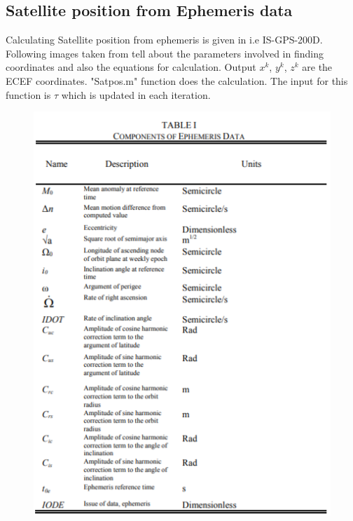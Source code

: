 \documentclass[conference,compsoc]{IEEEtran}
\begin{document}
\subsection{Satellite position from Ephemeris data}
Calculating Satellite position from ephemeris is given in \cite{doc1} i.e IS-GPS-200D. Following images taken from \cite{doc1} tell about the parameters involved in finding coordinates and also the equations for calculation. Output $x^k$, $y^k$, $z^k$ are the ECEF coordinates. "Satpos.m" function does the calculation. The input for this function is $\tau$ which is updated in each iteration.
\begin{figure}[!h]
	\centering
	\includegraphics[scale = 0.5]{images/table1.png}
	\caption{}
\end{figure}
\end{document}
